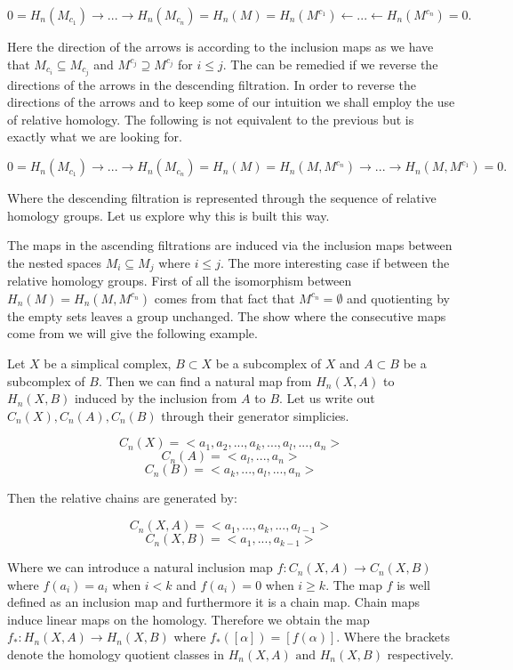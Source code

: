 $$ 0 = H_n(M_{c_1}) \rightarrow ... \rightarrow H_n(M_{c_n}) = H_n(M) = H_n(M^{c_1}) \leftarrow ... \leftarrow H_n(M^{c_{n}}) = 0.$$

Here the direction of the arrows is according to the inclusion maps as we have that $M_{c_i} \subseteq M_{c_j}$ and $M^{c_j} \supseteq M^{c_j}$ for $i \le j$. The can be remedied if we reverse the directions of the arrows in the descending filtration. In order to reverse the directions of the arrows and to keep some of our intuition we shall employ the use of relative homology. The following is not equivalent to the previous but is exactly what we are looking for.

$$ 0 = H_n(M_{c_1}) \rightarrow ... \rightarrow H_n(M_{c_n}) = H_n(M) = H_n(M, M^{c_n}) \rightarrow ... \rightarrow H_n(M, M^{c_{1}}) = 0.$$

Where the descending filtration is represented through the sequence of relative homology groups. Let us explore why this is built this way.

The maps in the ascending filtrations are induced via the inclusion maps between the nested spaces $M_i \subseteq M_j$  where $i \le j$. The more interesting case if between the relative homology groups. First of all the isomorphism between $H_n(M) = H_n(M, M^{c_n})$ comes from that fact that $M^{c_n} = \emptyset$ and quotienting by the empty sets leaves a group unchanged. The show where the consecutive maps come from we will give the following example.

Let $X$ be a simplical complex, $B \subset X$ be a subcomplex of $X$ and $A \subset B$ be a subcomplex of $B$. Then we can find a natural map from $H_n(X, A)$ to $H_n(X, B)$ induced by the inclusion from $A$ to $B$. Let us write out $C_n(X), C_n(A), C_n(B)$ through their generator simplicies.

$$ C_n(X) = <a_1, a_2, ..., a_k, ..., a_l, ..., a_n> $$
$$ C_n(A) = <a_l, ..., a_n>$$
$$ C_n(B) = <a_k, ..., a_l, ..., a_n>$$


Then the relative chains are generated by:

$$ C_n(X, A) = <a_1, ..., a_k, ..., a_{l-1}>$$
$$ C_n(X, B) = <a_1, ..., a_{k-1}>$$



Where we can introduce a natural inclusion map $f : C_n(X, A) \to C_n(X, B)$ where $f(a_i) = a_i$ when $i < k$ and $f(a_i) = 0$ when $i \ge k$. The map $f$ is well defined as an inclusion map and furthermore it is a chain map. Chain maps induce linear maps on the homology. Therefore we obtain the map $f_* : H_n(X, A) \to H_n(X, B)$ where $f_*([\alpha]) = [f(\alpha)]$. Where the brackets denote the homology quotient classes in $H_n(X, A) \text{ and } H_n(X, B)$ respectively.

